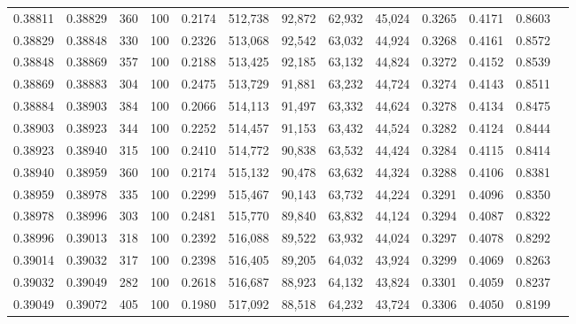 \begin{tabular}{rrrrrrrrrrrrr}
0.38811 & 0.38829 &   360 & 100 &                                     0.2174 & 512,738 &  92,872 &  62,932 &  45,024 & 0.3265 & 0.4171 & 0.8603 \\
0.38829 & 0.38848 &   330 & 100 &                                     0.2326 & 513,068 &  92,542 &  63,032 &  44,924 & 0.3268 & 0.4161 & 0.8572 \\
0.38848 & 0.38869 &   357 & 100 &                                     0.2188 & 513,425 &  92,185 &  63,132 &  44,824 & 0.3272 & 0.4152 & 0.8539 \\
0.38869 & 0.38883 &   304 & 100 &                                     0.2475 & 513,729 &  91,881 &  63,232 &  44,724 & 0.3274 & 0.4143 & 0.8511 \\
0.38884 & 0.38903 &   384 & 100 &                                     0.2066 & 514,113 &  91,497 &  63,332 &  44,624 & 0.3278 & 0.4134 & 0.8475 \\
0.38903 & 0.38923 &   344 & 100 &                                     0.2252 & 514,457 &  91,153 &  63,432 &  44,524 & 0.3282 & 0.4124 & 0.8444 \\
0.38923 & 0.38940 &   315 & 100 &                                     0.2410 & 514,772 &  90,838 &  63,532 &  44,424 & 0.3284 & 0.4115 & 0.8414 \\
0.38940 & 0.38959 &   360 & 100 &                                     0.2174 & 515,132 &  90,478 &  63,632 &  44,324 & 0.3288 & 0.4106 & 0.8381 \\
0.38959 & 0.38978 &   335 & 100 &                                     0.2299 & 515,467 &  90,143 &  63,732 &  44,224 & 0.3291 & 0.4096 & 0.8350 \\
0.38978 & 0.38996 &   303 & 100 &                                     0.2481 & 515,770 &  89,840 &  63,832 &  44,124 & 0.3294 & 0.4087 & 0.8322 \\
0.38996 & 0.39013 &   318 & 100 &                                     0.2392 & 516,088 &  89,522 &  63,932 &  44,024 & 0.3297 & 0.4078 & 0.8292 \\
0.39014 & 0.39032 &   317 & 100 &                                     0.2398 & 516,405 &  89,205 &  64,032 &  43,924 & 0.3299 & 0.4069 & 0.8263 \\
0.39032 & 0.39049 &   282 & 100 &                                     0.2618 & 516,687 &  88,923 &  64,132 &  43,824 & 0.3301 & 0.4059 & 0.8237 \\
0.39049 & 0.39072 &   405 & 100 &                                     0.1980 & 517,092 &  88,518 &  64,232 &  43,724 & 0.3306 & 0.4050 & 0.8199 \\

\end{tabular}
